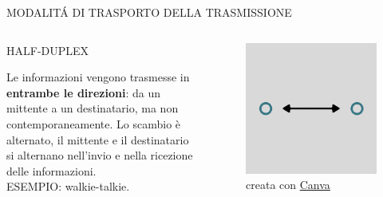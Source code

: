 \documentclass[aspectratio=1610,handout]{beamer}
\begin{document}
\begin{frame}{MODALIT\'A DI TRASPORTO DELLA TRASMISSIONE}
    \begin{columns}
        \begin{alertblock}{HALF-DUPLEX}
            \begin{minipage}{0.96\linewidth}
                \justifying
                Le informazioni vengono trasmesse in \textbf{entrambe le direzioni}: da un mittente a un 
                destinatario, ma non contemporaneamente. Lo scambio è alternato, il mittente e il destinatario si alternano
                nell'invio e nella ricezione delle informazioni.\\
                ESEMPIO: walkie-talkie.
            \end{minipage}
        \end{alertblock}
           \begin{figure}
               \includegraphics[width=\linewidth]{img/halfduplex.png}
               \caption{{creata con \href{https://www.canva.com}{Canva}}}
           \end{figure}
    \end{columns}
\end{frame}
\end{document}
